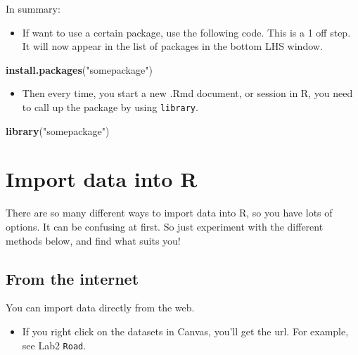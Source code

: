 \documentclass[]{article}
\newenvironment{Shaded}{\begin{snugshade}}{\end{snugshade}}
\newcommand{\KeywordTok}[1]{\textcolor[rgb]{0.13,0.29,0.53}{\textbf{#1}}}
\newcommand{\NormalTok}[1]{#1}
\newcommand{\StringTok}[1]{\textcolor[rgb]{0.31,0.60,0.02}{#1}}
\providecommand{\tightlist}{%
  \setlength{\itemsep}{0pt}\setlength{\parskip}{0pt}}
\begin{document}
In summary:

\begin{itemize}
\tightlist
\item
  If want to use a certain package, use the following code. This is a 1 off step. It will now appear in the list of packages in the bottom LHS window.
\end{itemize}

\begin{Shaded}
\begin{Highlighting}[]
\KeywordTok{install.packages}\NormalTok{(}\StringTok{"somepackage"}\NormalTok{)}
\end{Highlighting}
\end{Shaded}

\begin{itemize}
\tightlist
\item
  Then every time, you start a new .Rmd document, or session in R, you need to call up the package by using \texttt{library}.
\end{itemize}

\begin{Shaded}
\begin{Highlighting}[]
\KeywordTok{library}\NormalTok{(}\StringTok{"somepackage"}\NormalTok{)}
\end{Highlighting}
\end{Shaded}

\hypertarget{importdata}{%
\section{Import data into R}\label{importdata}}

There are so many different ways to import data into R, so you have lots of options.
It can be confusing at first. So just experiment with the different methods below, and find what suits you!

\hypertarget{from-the-internet}{%
\subsection{From the internet}\label{from-the-internet}}

You can import data directly from the web.

\begin{itemize}
\tightlist
\item
  If you right click on the datasets in Canvas, you'll get the url. For example, see Lab2 \texttt{Road}.
\end{itemize}
\end{document}
